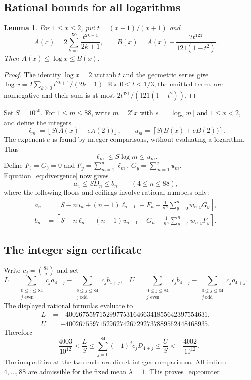 \documentclass[11pt]{article}
\newtheorem{lemma}{Lemma}
\begin{document}
\subsection*{Rational bounds for all logarithms}

\begin{lemma}
For $1\leq x\leq2$, put $t=(x-1)/(x+1)$ and
\[
 A(x)=2\sum_{k=0}^{59}\frac{t^{2k+1}}{2k+1},
 \qquad
 B(x)=A(x)+\frac{2t^{121}}{121(1-t^2)}.
\]
Then $A(x)\leq\log x\leq B(x)$.
\end{lemma}
\begin{proof}
The identity $\log x=2\operatorname{arctanh}t$ and the geometric
series give
$\log x=2\sum_{k\geq0}t^{2k+1}/(2k+1)$.
For $0\leq t\leq1/3$, the omitted terms are nonnegative and their
sum is at most $2t^{121}/(121(1-t^2))$.
\end{proof}

Set $S=10^{50}$. For $1\leq m\leq88$, write $m=2^e x$ with
$e=\lfloor\log_2m\rfloor$ and $1\leq x<2$, and define the integers
\[
 \ell_m=\left\lfloor S\bigl(A(x)+eA(2)\bigr)\right\rfloor,\qquad
 u_m=\left\lceil S\bigl(B(x)+eB(2)\bigr)\right\rceil.
\]
The exponent $e$ is found by integer comparisons, without evaluating
a logarithm. Thus
\[
 \ell_m\leq S\log m\leq u_m.
\]
Define $F_0=G_0=0$ and
$F_y=\sum_{m=1}^y\ell_m$, $G_y=\sum_{m=1}^y u_m$.
Equation~\eqref{eq:divergence} now gives
\[
 a_n\leq SD_n\leq b_n \qquad(4\leq n\leq88),
\]
where the following floors and ceilings involve rational numbers only:
\begin{align*}
 a_n&=\left\lfloor
 S-nu_n+(n-1)\ell_{n-1}+F_n
 -\frac1{n^n}\sum_{y=0}^n w_{n,y}G_y
 \right\rfloor,\\
 b_n&=\left\lceil
 S-n\ell_n+(n-1)u_{n-1}+G_n
 -\frac1{n^n}\sum_{y=0}^n w_{n,y}F_y
 \right\rceil.
\end{align*}

\subsection*{The integer sign certificate}

Write $c_j=\binom{84}{j}$ and set
\[
 L=\sum_{\substack{0\leq j\leq84\\j\text{ even}}}c_ja_{4+j}
   -\sum_{\substack{0\leq j\leq84\\j\text{ odd}}}c_jb_{4+j},
 \quad
 U=\sum_{\substack{0\leq j\leq84\\j\text{ even}}}c_jb_{4+j}
   -\sum_{\substack{0\leq j\leq84\\j\text{ odd}}}c_ja_{4+j}.
\]
The displayed rational formulas evaluate to
\begin{align*}
 L&=-400267559715299775316466341855642397554631,\\
 U&=-400267559715296274267292737889552448468935.
\end{align*}
Therefore
\[
 -\frac{4003}{10^{12}}
 <\frac LS
 \leq\sum_{j=0}^{84}(-1)^jc_jD_{4+j}
 \leq\frac US
 <-\frac{4002}{10^{12}}.
\]
The inequalities at the two ends are direct integer comparisons.
All indices $4,\ldots,88$ are admissible for the fixed mean $\lambda=1$.
This proves~\eqref{eq:counter}.
\end{document}
